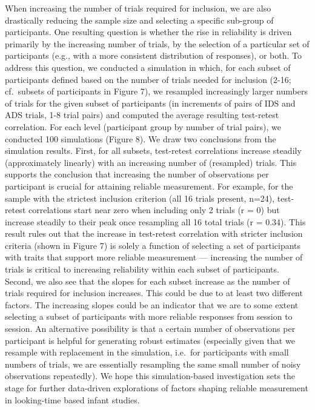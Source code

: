 \documentclass[
  man, donotrepeattitle,floatsintext]{apa6}
\begin{document}
When increasing the number of trials required for inclusion, we are also drastically reducing the sample size and selecting a specific sub-group of participants.
One resulting question is whether the rise in reliability is driven primarily by the increasing number of trials, by the selection of a particular set of participants (e.g., with a more consistent distribution of responses), or both.
To address this question, we conducted a simulation in which, for each subset of participants defined based on the number of trials needed for inclusion (2-16; cf.~subsets of participants in Figure 7), we resampled increasingly larger numbers of trials for the given subset of participants (in increments of pairs of IDS and ADS trials, 1-8 trial pairs) and computed the average resulting test-retest correlation.
For each level (participant group by number of trial pairs), we conducted 100 simulations (Figure 8).
We draw two conclusions from the simulation results.
First, for all subsets, test-retest correlations increase steadily (approximately linearly) with an increasing number of (resampled) trials.
This supports the conclusion that increasing the number of observations per participant is crucial for attaining reliable measurement.
For example, for the sample with the strictest inclusion criterion (all 16 trials present, n=24), test-retest correlations start near zero when including only 2 trials (r = 0) but increase steadily to their peak once resampling all 16 total trials (r = 0.34).
This result rules out that the increase in test-retest correlation with stricter inclusion criteria (shown in Figure 7) is solely a function of selecting a set of participants with traits that support more reliable measurement --- increasing the number of trials is critical to increasing reliability within each subset of participants.
Second, we also see that the slopes for each subset increase as the number of trials required for inclusion increases.
This could be due to at least two different factors.
The increasing slopes could be an indicator that we are to some extent selecting a subset of participants with more reliable responses from session to session.
An alternative possibility is that a certain number of observations per participant is helpful for generating robust estimates (especially given that we resample with replacement in the simulation, i.e.~for participants with small numbers of trials, we are essentially resampling the same small number of noisy observations repeatedly).
We hope this simulation-based investigation sets the stage for further data-driven explorations of factors shaping reliable measurement in looking-time based infant studies.
\end{document}
